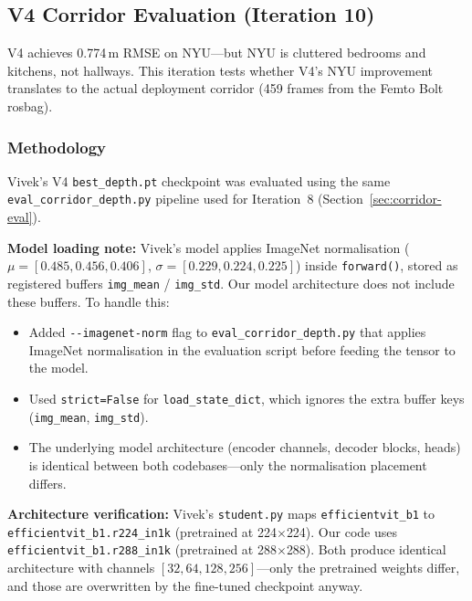 \documentclass[11pt,a4paper]{article}
\begin{document}
\subsection{V4 Corridor Evaluation (Iteration 10)}
\label{sec:vivek-corridor}

V4 achieves 0.774\,m RMSE on NYU---but NYU is cluttered bedrooms and kitchens,
not hallways. This iteration tests whether V4's NYU improvement translates
to the actual deployment corridor (459 frames from the Femto Bolt rosbag).

\subsubsection{Methodology}

Vivek's V4 \texttt{best\_depth.pt} checkpoint was evaluated using the same
\texttt{eval\_corridor\_depth.py} pipeline used for Iteration~8
(Section~\ref{sec:corridor-eval}).

\textbf{Model loading note:} Vivek's model applies ImageNet normalisation
($\mu = [0.485, 0.456, 0.406]$, $\sigma = [0.229, 0.224, 0.225]$) inside
\texttt{forward()}, stored as registered buffers \texttt{img\_mean} /
\texttt{img\_std}. Our model architecture does not include these buffers.
To handle this:
\begin{itemize}[nosep]
  \item Added \texttt{-{}-imagenet-norm} flag to \texttt{eval\_corridor\_depth.py}
    that applies ImageNet normalisation in the evaluation script before feeding
    the tensor to the model.
  \item Used \texttt{strict=False} for \texttt{load\_state\_dict}, which
    ignores the extra buffer keys (\texttt{img\_mean}, \texttt{img\_std}).
  \item The underlying model architecture (encoder channels, decoder blocks,
    heads) is identical between both codebases---only the normalisation
    placement differs.
\end{itemize}

\textbf{Architecture verification:} Vivek's \texttt{student.py} maps
\texttt{efficientvit\_b1} to \texttt{efficientvit\_b1.r224\_in1k} (pretrained
at 224$\times$224). Our code uses \texttt{efficientvit\_b1.r288\_in1k}
(pretrained at 288$\times$288). Both produce identical architecture with
channels $[32, 64, 128, 256]$---only the pretrained weights differ, and those
are overwritten by the fine-tuned checkpoint anyway.
\end{document}
